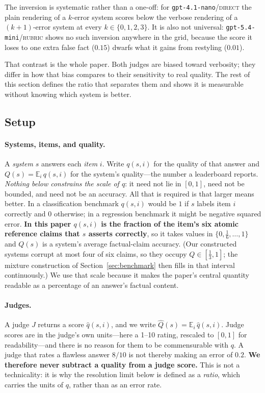 \documentclass{article}
\theoremstyle{plain}
\theoremstyle{definition}
\newcommand{\qhat}{\hat{q}}
\newcommand{\Qhat}{\hat{Q}}
\begin{document}
The inversion is systematic rather than a one-off: for \texttt{gpt-4.1-nano}/\textsc{direct}
the plain rendering of a $k$-error system scores below the verbose rendering of a
$(k{+}1)$-error system at every $k\in\{0,1,2,3\}$. It is also not universal:
\texttt{gpt-5.4-mini}/\textsc{rubric} shows no such inversion anywhere in the grid, because the
score it loses to one extra false fact ($0.15$) dwarfs what it gains from restyling ($0.01$).

That contrast is the whole paper. Both judges are biased toward verbosity; they differ in how
that bias compares to their sensitivity to real quality. The rest of this section defines the
ratio that separates them and shows it is measurable without knowing which system is better.

\subsection{Setup}
\label{sec:setup}

\paragraph{Systems, items, and quality.} A \emph{system} $s$ answers each \emph{item} $i$.
Write $q(s,i)$ for the quality of that answer and $Q(s)=\mathbb{E}_i\,q(s,i)$ for the system's
quality---the number a leaderboard reports. \emph{Nothing below constrains the scale of $q$}:
it need not lie in $[0,1]$, need not be bounded, and need not be an accuracy. All that is
required is that larger means better. In a classification benchmark $q(s,i)$ would be $1$ if
$s$ labels item $i$ correctly and $0$ otherwise; in a regression benchmark it might be negative
squared error. \textbf{In this paper $q(s,i)$ is the fraction of the item's six atomic
reference claims that $s$ asserts correctly}, so it takes values in
$\{0,\tfrac16,\dots,1\}$ and $Q(s)$ is a system's average factual-claim accuracy. (Our
constructed systems corrupt at most four of six claims, so they occupy $Q\in[\tfrac13,1]$; the
mixture construction of Section~\ref{sec:benchmark} then fills in that interval continuously.) We use that
scale because it makes the paper's central quantity readable as a percentage of an answer's
factual content.

\paragraph{Judges.} A judge $J$ returns a score $\qhat(s,i)$, and we write
$\Qhat(s)=\mathbb{E}_i\,\qhat(s,i)$. Judge scores are in the judge's own units---here a 1--10
rating, rescaled to $[0,1]$ for readability---and there is no reason for them to be
commensurable with $q$. A judge that rates a flawless answer $8/10$ is not thereby making an
error of $0.2$. \textbf{We therefore never subtract a quality from a judge score.} This is not
a technicality: it is why the resolution limit below is defined as a \emph{ratio}, which
carries the units of $q$, rather than as an error rate.
\end{document}

